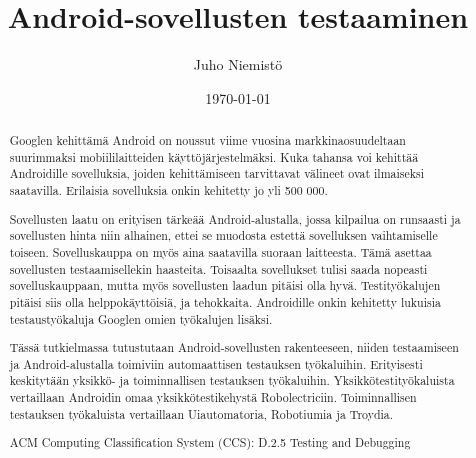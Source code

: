\documentclass[emptyfirstpagenumber,gradu]{tktltiki}
\begin{document}
\sloppy
\lstset{language=Java}
\title{Android-sovellusten testaaminen}
\author{Juho Niemistö}
\date{\today}
\maketitle

\onehalfspacing

\subject{Tietojenkäsittelytiede}


\begin{abstract}
Googlen kehittämä Android on noussut viime vuosina markkinaosuudeltaan suurimmaksi mobiililaitteiden käyttöjärjestelmäksi. Kuka tahansa voi kehittää Androidille sovelluksia, joiden kehittämiseen tarvittavat välineet ovat ilmaiseksi saatavilla. Erilaisia sovelluksia onkin kehitetty jo yli 500 000.

Sovellusten laatu on erityisen tärkeää Android-alustalla, jossa kilpailua on runsaasti ja sovellusten hinta niin alhainen, ettei se muodosta estettä sovelluksen vaihtamiselle toiseen. Sovelluskauppa on myös aina saatavilla suoraan laitteesta. Tämä asettaa sovellusten testaamisellekin haasteita. Toisaalta sovellukset tulisi saada nopeasti sovelluskauppaan, mutta myös sovellusten laadun pitäisi olla hyvä. Testityökalujen pitäisi siis olla helppokäyttöisiä, ja tehokkaita. Androidille onkin kehitetty lukuisia testaustyökaluja Googlen omien työkalujen lisäksi.

Tässä tutkielmassa tutustutaan Android-sovellusten rakenteeseen, niiden testaamiseen ja Android-alustalla toimiviin automaattisen testauksen työkaluihin. Erityisesti keskitytään yksikkö- ja toiminnallisen testauksen työkaluihin. Yksikkötestityökaluista vertaillaan Androidin omaa yksikkötestikehystä Robolectriciin. Toiminnallisen testauksen työkaluista vertaillaan Uiautomatoria, Robotiumia ja Troydia.

ACM Computing Classification System (CCS):
D.2.5 Testing and Debugging

\end{abstract}

\setcounter{tocdepth}{3}
\mytableofcontents



\clearpage

\clearpage

\clearpage

\clearpage

\clearpage

\clearpage


\clearpage



\lastpage

\appendices


\end{document}
